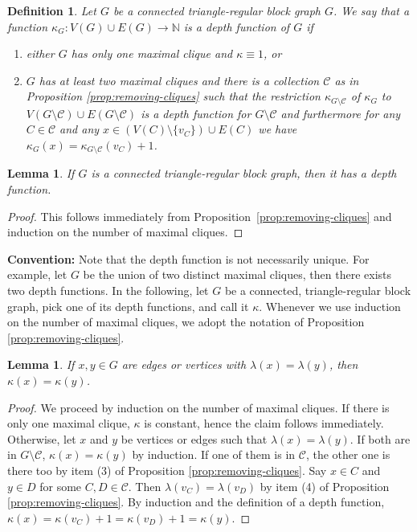 \documentclass[a4paper, 11pt]{amsart}
\numberwithin{theorem}{section}
\newtheorem{definition}[theorem]{Definition}
\newtheorem{lemma}[theorem]{Lemma}
\newcommand{\cC}{\mathcal{C}}
\def\N{{\mathbb N}}
\begin{document}
\begin{definition}\label{def:depth-function}
    Let $G$ be a connected triangle-regular block graph $G$. We say that a function $\kappa_G: V(G)\cup E(G)\to \N$ is a \emph{depth function of $G$} if 
    \begin{enumerate}
        \item either $G$ has only one maximal clique and $\kappa
	\equiv 1$, or 
        \item $G$ has at least two maximal cliques and there is a
	collection  $\mathcal{C}$ as in Proposition
	\ref{prop:removing-cliques} such that the restriction
	$\kappa_{G \setminus \cC}$ of
	$\kappa_G$ to $V(G \setminus \cC) \cup E(G \setminus \cC)$ is
	a depth function for $G
	\setminus \cC$ and furthermore for any $C \in \cC$ and any
	$x \in (V(C) \setminus \{v_C\}) \cup E(C)$ 
	we have $\kappa_G(x)=\kappa_{G \setminus \cC}(v_C)+1$. 
    \end{enumerate}
\end{definition}

\begin{lemma}
    If $G$ is a connected triangle-regular block graph, then it has a depth function.
\end{lemma}
\begin{proof}
    This follows immediately from
    Proposition~\ref{prop:removing-cliques} and induction on the number of maximal cliques.
\end{proof}

\textbf{Convention:} Note that the depth function is not necessarily
unique. For example, let $G$ be the union of two distinct maximal cliques, then there exists two depth functions. 
In the following, let $G$ be a connected, triangle-regular block
graph, pick one of its depth functions, and call it $\kappa$. Whenever we use induction on the number of maximal cliques, we adopt the notation of Proposition \ref{prop:removing-cliques}.

\begin{lemma}\label{lemma:lambda-to-kappa}
    If $x,y\in G$ are edges or vertices with $\lambda(x) = \lambda(y)$, then $\kappa(x) = \kappa(y)$.
\end{lemma}
\begin{proof}
    We proceed by induction on the number of maximal cliques. If there
    is only one maximal clique, $\kappa$ is constant, hence the claim
    follows immediately. Otherwise, let $x$ and $y$ be vertices or
    edges such that $\lambda(x) = \lambda(y)$. If both are in
    $G\setminus \mathcal C$, $\kappa(x) = \kappa(y)$ by induction. If
    one of them is in $\mathcal C$, the other one is there too by item
    (3) of Proposition \ref{prop:removing-cliques}. Say $x\in C$ and
    $y\in D$ for some $C,D\in \mathcal C$. Then $\lambda(v_C) =
    \lambda(v_D)$ by item (4) of Proposition
    \ref{prop:removing-cliques}. By induction and the definition of a depth function, $\kappa(x) = \kappa(v_C) +1 = \kappa(v_D) +1 = \kappa(y)$.
\end{proof}
\end{document}
